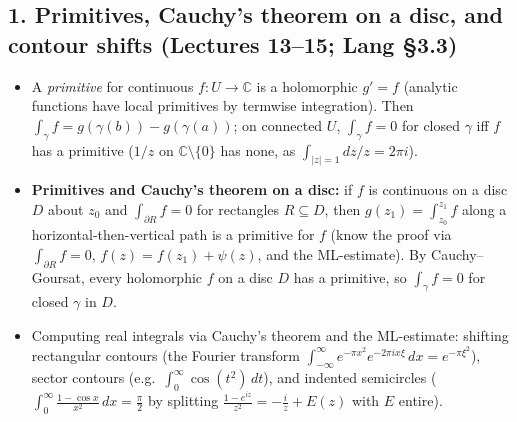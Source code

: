 \documentclass[12pt, reqno]{amsart}
\theoremstyle{definition}
\numberwithin{equation}{subsection}
\newcommand{\C}{\mathbb{C}}
\begin{document}
\subsection*{1. Primitives, Cauchy's theorem on a disc, and contour shifts \normalfont (Lectures 13--15; Lang \S3.3)}
\begin{itemize}[leftmargin=*]
\item A \emph{primitive} for continuous $f:U\to\C$ is a holomorphic $g'=f$ (analytic functions have local primitives
      by termwise integration). Then $\int_\gamma f=g(\gamma(b))-g(\gamma(a))$; on connected $U$,
      $\int_\gamma f=0$ for closed $\gamma$ iff $f$ has a primitive ($1/z$ on $\C\setminus\{0\}$ has none, as $\int_{|z|=1}dz/z=2\pi i$).
\item \textbf{Primitives and Cauchy's theorem on a disc:} if $f$ is continuous on a disc $D$ about $z_0$ and $\int_{\partial R}f=0$
      for rectangles $R\subseteq D$, then $g(z_1)=\int_{z_0}^{z_1}f$ along a horizontal-then-vertical path is a primitive for $f$
      (know the proof via $\int_{\partial R}f=0$, $f(z)=f(z_1)+\psi(z)$, and the ML-estimate).
      By Cauchy--Goursat, every holomorphic $f$ on a disc $D$ has a primitive, so $\int_\gamma f=0$ for closed $\gamma$ in $D$.
\item Computing real integrals via Cauchy's theorem and the ML-estimate: shifting rectangular contours
      (the Fourier transform $\int_{-\infty}^\infty e^{-\pi x^2}e^{-2\pi ix\xi}\,dx=e^{-\pi\xi^2}$), sector contours (e.g.\ $\int_0^\infty\cos(t^2)\,dt$),
      and indented semicircles ($\int_0^\infty\frac{1-\cos x}{x^2}\,dx=\frac\pi2$ by splitting $\frac{1-e^{iz}}{z^2}=-\frac iz+E(z)$ with $E$ entire).
\end{itemize}
\end{document}
